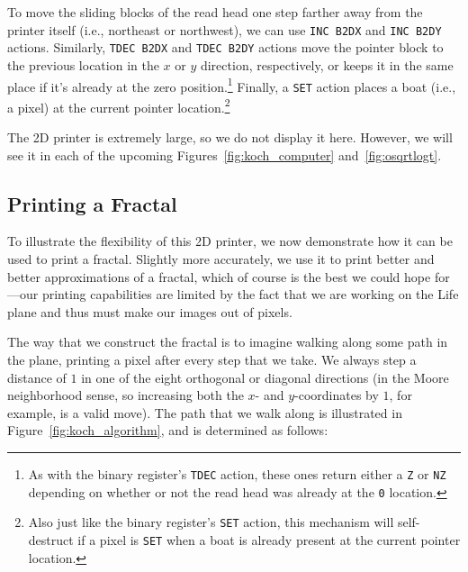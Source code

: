 To move the sliding blocks of the read head one step farther away from the printer itself (i.e., northeast or northwest), we can use \texttt{INC B2DX} and \texttt{INC B2DY} actions. Similarly, \texttt{TDEC B2DX} and \texttt{TDEC B2DY} actions move the pointer block to the previous location in the $x$ or $y$ direction, respectively, or keeps it in the same place if it's already at the zero position.\footnote{As with the binary register's \texttt{TDEC} action, these ones return either a \texttt{Z} or \texttt{NZ} depending on whether or not the read head was already at the \texttt{0} location.} Finally, a \texttt{SET} action places a boat (i.e., a pixel) at the current pointer location.\footnote{Also just like the binary register's \texttt{SET} action, this mechanism will self-destruct if a pixel is \texttt{SET} when a boat is already present at the current pointer location.}


The 2D printer is extremely large, so we do not display it here. However, we will see it in each of the upcoming Figures~\ref{fig:koch_computer} and~\ref{fig:osqrtlogt}.




\subsection{Printing a Fractal}\label{sec:koch_snowflake}

To illustrate the flexibility of this 2D printer, we now demonstrate how it can be used to print a fractal. Slightly more accurately, we use it to print better and better approximations of a fractal, which of course is the best we could hope for---our printing capabilities are limited by the fact that we are working on the Life plane and thus must make our images out of pixels.

The way that we construct the fractal is to imagine walking along some path in the plane, printing a pixel after every step that we take. We always step a distance of $1$ in one of the eight orthogonal or diagonal directions (in the Moore neighborhood  sense, so increasing both the $x$- and $y$-coordinates by $1$, for example, is a valid move). The path that we walk along is illustrated in Figure~\ref{fig:koch_algorithm}, and is determined as follows:\smallskip

